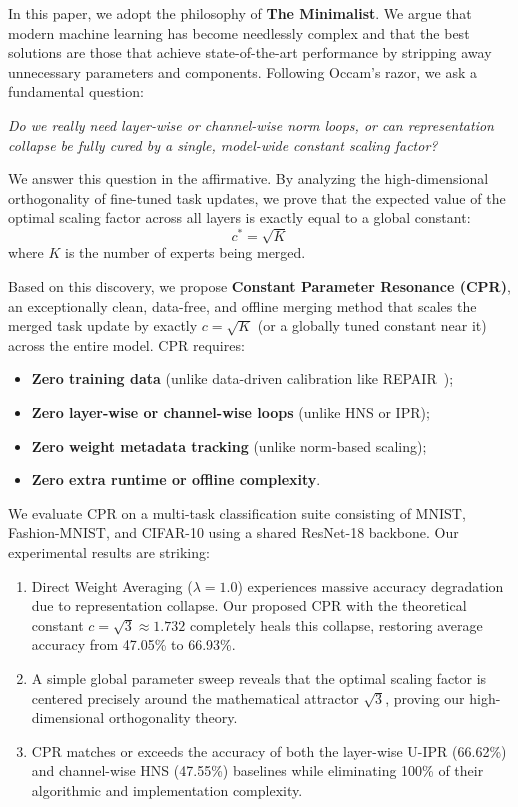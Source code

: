 \documentclass{article}
\theoremstyle{plain}
\theoremstyle{definition}
\theoremstyle{remark}
\begin{document}
In this paper, we adopt the philosophy of \textbf{The Minimalist}. We argue that modern machine learning has become needlessly complex and that the best solutions are those that achieve state-of-the-art performance by stripping away unnecessary parameters and components. Following Occam's razor, we ask a fundamental question:
\begin{center}
\emph{Do we really need layer-wise or channel-wise norm loops, or can representation collapse be fully cured by a single, model-wide constant scaling factor?}
\end{center}

We answer this question in the affirmative. By analyzing the high-dimensional orthogonality of fine-tuned task updates, we prove that the expected value of the optimal scaling factor across all layers is exactly equal to a global constant:
\begin{equation}
c^* = \sqrt{K}
\end{equation}
where $K$ is the number of experts being merged. 

Based on this discovery, we propose \textbf{Constant Parameter Resonance (CPR)}, an exceptionally clean, data-free, and offline merging method that scales the merged task update by exactly $c = \sqrt{K}$ (or a globally tuned constant near it) across the entire model. CPR requires:
\begin{itemize}
\item \textbf{Zero training data} (unlike data-driven calibration like REPAIR~\cite{jordan2023repair});
\item \textbf{Zero layer-wise or channel-wise loops} (unlike HNS or IPR);
\item \textbf{Zero weight metadata tracking} (unlike norm-based scaling);
\item \textbf{Zero extra runtime or offline complexity}.
\end{itemize}

We evaluate CPR on a multi-task classification suite consisting of MNIST, Fashion-MNIST, and CIFAR-10 using a shared ResNet-18 backbone. Our experimental results are striking:
\begin{enumerate}
\item Direct Weight Averaging ($\lambda=1.0$) experiences massive accuracy degradation due to representation collapse.
Our proposed CPR with the theoretical constant $c = \sqrt{3} \approx 1.732$ completely heals this collapse, restoring average accuracy from 47.05\% to 66.93\%.
\item A simple global parameter sweep reveals that the optimal scaling factor is centered precisely around the mathematical attractor $\sqrt{3}$, proving our high-dimensional orthogonality theory.
\item CPR matches or exceeds the accuracy of both the layer-wise U-IPR (66.62\%) and channel-wise HNS (47.55\%) baselines while eliminating 100\% of their algorithmic and implementation complexity.
\end{enumerate}
\end{document}
